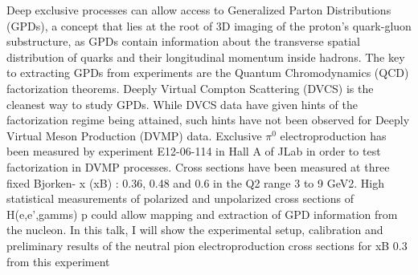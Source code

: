 Deep exclusive processes can allow access to Generalized Parton Distributions (GPDs),
a concept that lies at the root of 3D imaging of the proton’s quark-gluon substructure,
as GPDs contain information about the transverse spatial distribution of quarks and their
longitudinal momentum inside hadrons. The key to extracting GPDs from experiments are
the Quantum Chromodynamics (QCD) factorization theorems. Deeply Virtual Compton
Scattering (DVCS) is the cleanest way to
study GPDs. While DVCS data have given hints of the factorization regime being
attained, such hints have not been observed for Deeply Virtual Meson Production (DVMP)
data. Exclusive $\pi^0$ electroproduction has been measured by experiment E12-06-114 in Hall
A of JLab in order to test factorization in DVMP processes. Cross sections have been
measured at three fixed Bjorken- x (xB) : 0.36, 0.48 and 0.6 in the Q2 range 3 to 9 GeV2.
High statistical measurements of polarized and unpolarized cross sections of H(e,e’,gamms)
p could allow mapping and extraction of GPD information from the nucleon. In this talk,
I will show the experimental setup, calibration and preliminary results of the neutral pion
electroproduction cross sections for xB 0.3 from this experiment


